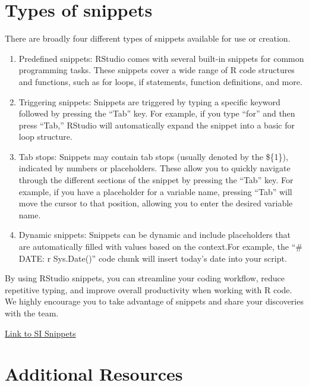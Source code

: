 \documentclass[
  letterpaper,
  DIV=11,
  numbers=noendperiod]{scrreprt}
\providecommand{\tightlist}{%
  \setlength{\itemsep}{0pt}\setlength{\parskip}{0pt}}\usepackage{longtable,booktabs,array}
\begin{document}
\hypertarget{types-of-snippets}{%
\section{Types of snippets}\label{types-of-snippets}}

There are broadly four different types of snippets available for use or
creation.

\begin{enumerate}
\def\labelenumi{\arabic{enumi})}
\tightlist
\item
  Predefined snippets: RStudio comes with several built-in snippets for
  common programming tasks. These snippets cover a wide range of R code
  structures and functions, such as for loops, if statements, function
  definitions, and more.
\item
  Triggering snippets: Snippets are triggered by typing a specific
  keyword followed by pressing the ``Tab'' key. For example, if you type
  ``for'' and then press ``Tab,'' RStudio will automatically expand the
  snippet into a basic for loop structure.
\item
  Tab stops: Snippets may contain tab stops (usually denoted by the
  \$\{1\}), indicated by numbers or placeholders. These allow you to
  quickly navigate through the different sections of the snippet by
  pressing the ``Tab'' key. For example, if you have a placeholder for a
  variable name, pressing ``Tab'' will move the cursor to that position,
  allowing you to enter the desired variable name.
\item
  Dynamic snippets: Snippets can be dynamic and include placeholders
  that are automatically filled with values based on the context.For
  example, the ``\# DATE: r Sys.Date()'' code chunk will insert today's
  date into your script.
\end{enumerate}

By using RStudio snippets, you can streamline your coding workflow,
reduce repetitive typing, and improve overall productivity when working
with R code. We highly encourage you to take advantage of snippets and
share your discoveries with the team.

\href{https://gist.github.com/tessam30/fc775a2f917ea5d62de0f6724c4aeada}{Link
to SI Snippets}

\hypertarget{additional-resources}{%
\section{Additional Resources}\label{additional-resources}}
\end{document}
